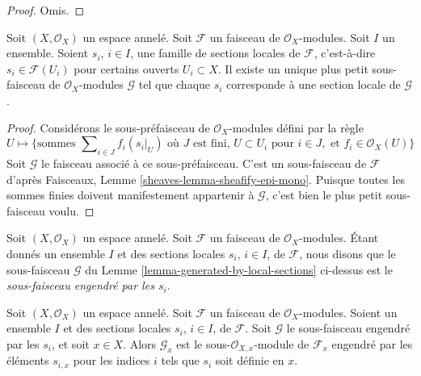 \begin{proof}
Omis.
\end{proof}

\begin{lemma}
\label{lemma-generated-by-local-sections}
Soit $(X, \mathcal{O}_X)$ un espace annelé. Soit $\mathcal{F}$ un faisceau de
$\mathcal{O}_X$-modules. Soit $I$ un ensemble. Soient $s_i$, $i \in I$, une
famille de sections locales de $\mathcal{F}$, c'est-à-dire
$s_i \in \mathcal{F}(U_i)$ pour certains ouverts $U_i \subset X$. Il existe
un unique plus petit sous-faisceau de $\mathcal{O}_X$-modules $\mathcal{G}$
tel que chaque $s_i$ corresponde à une section locale de $\mathcal{G}$.
\end{lemma}

\begin{proof}
Considérons le sous-préfaisceau de $\mathcal{O}_X$-modules défini par la règle
$$
U
\longmapsto
\{
\text{sommes } \sum\nolimits_{i \in J} f_i (s_i|_U)
\text{ où } J \text{ est fini, }
U \subset U_i \text{ pour } i\in J, \text{ et }
f_i \in \mathcal{O}_X(U)
\}
$$
Soit $\mathcal{G}$ le faisceau associé à ce sous-préfaisceau. C'est un
sous-faisceau de $\mathcal{F}$ d'après Faisceaux, Lemme
\ref{sheaves-lemma-sheafify-epi-mono}. Puisque toutes les sommes finies
doivent manifestement appartenir à $\mathcal{G}$, c'est bien le plus petit
sous-faisceau voulu.
\end{proof}

\begin{definition}
\label{definition-generated-by-local-sections}
Soit $(X, \mathcal{O}_X)$ un espace annelé. Soit $\mathcal{F}$ un faisceau de
$\mathcal{O}_X$-modules. Étant donnés un ensemble $I$ et des sections locales
$s_i$, $i \in I$, de $\mathcal{F}$, nous disons que le sous-faisceau
$\mathcal{G}$ du Lemme \ref{lemma-generated-by-local-sections} ci-dessus est
le {\it sous-faisceau engendré par les $s_i$}.
\end{definition}

\begin{lemma}
\label{lemma-generated-by-local-sections-stalk}
Soit $(X, \mathcal{O}_X)$ un espace annelé. Soit $\mathcal{F}$ un faisceau de
$\mathcal{O}_X$-modules. Soient un ensemble $I$ et des sections locales
$s_i$, $i \in I$, de $\mathcal{F}$. Soit $\mathcal{G}$ le sous-faisceau
engendré par les $s_i$, et soit $x\in X$. Alors $\mathcal{G}_x$ est le
sous-$\mathcal{O}_{X, x}$-module de $\mathcal{F}_x$ engendré par les éléments
$s_{i, x}$ pour les indices $i$ tels que $s_i$ soit définie en $x$.
\end{lemma}

